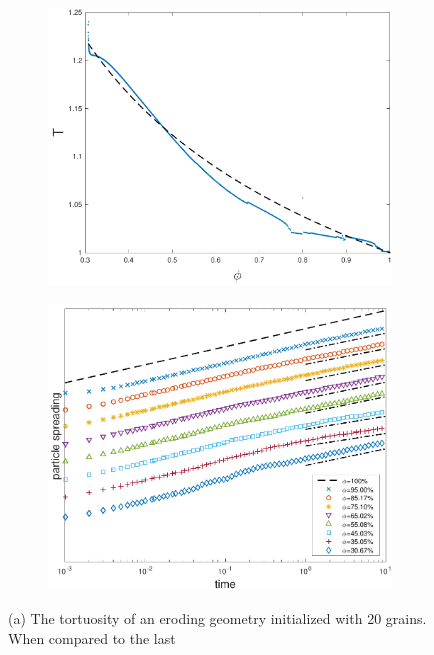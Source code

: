 \documentclass{jfm}
\begin{document}
\begin{figure}
\begin{subfigure}[b]{0.5\textwidth}
\includegraphics*[height = 0.8\linewidth]{./figs/tort_eulerian20b}
\caption{}
\end{subfigure}
\begin{subfigure}[b]{0.5\textwidth}
\includegraphics*[height=0.8\linewidth]{./figs/20b_dense_second_moment_ref}
\caption{}
\end{subfigure}
\caption{\label{fig:ErodingLow20Transport} (a) The tortuosity of an
eroding geometry initialized with 20 grains.  When compared to the last
}
\end{figure}
\end{document}
